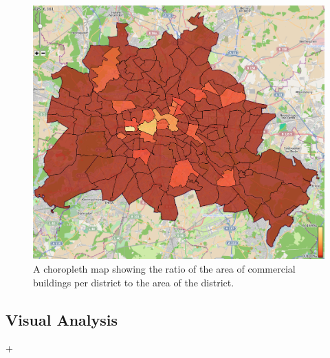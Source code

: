\begin{figure}
        \centering
		\includegraphics[width=0.8\linewidth]{imgs/commercial}
        \caption{A choropleth map showing the ratio of the area of commercial buildings
        per district to the area of the district.}
		\label{fig:commercial}
\end{figure}

\subsection*{Visual Analysis}

\todo{}

+


